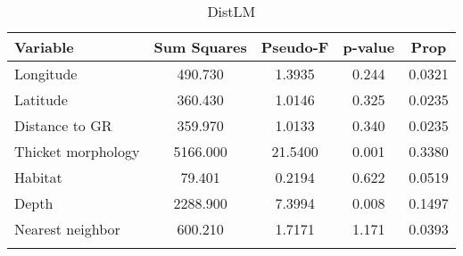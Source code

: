 \begin{longtable}{lcccc}
\toprule
\textbf{Variable} & \textbf{Sum Squares} & \textbf{Pseudo-F} & \textbf{p-value} & \textbf{Prop} \\ 
\midrule
Longitude & 490.730 & 1.3935 & 0.244 & 0.0321 \\ 
Latitude & 360.430 & 1.0146 & 0.325 & 0.0235 \\ 
Distance to GR & 359.970 & 1.0133 & 0.340 & 0.0235 \\ 
Thicket morphology & 5166.000 & 21.5400 & 0.001 & 0.3380 \\ 
Habitat & 79.401 & 0.2194 & 0.622 & 0.0519 \\ 
Depth & 2288.900 & 7.3994 & 0.008 & 0.1497 \\ 
Nearest neighbor & 600.210 & 1.7171 & 1.171 & 0.0393 \\ 
\bottomrule
\caption{\label{tab:somelabel} DistLM}
\end{longtable}

